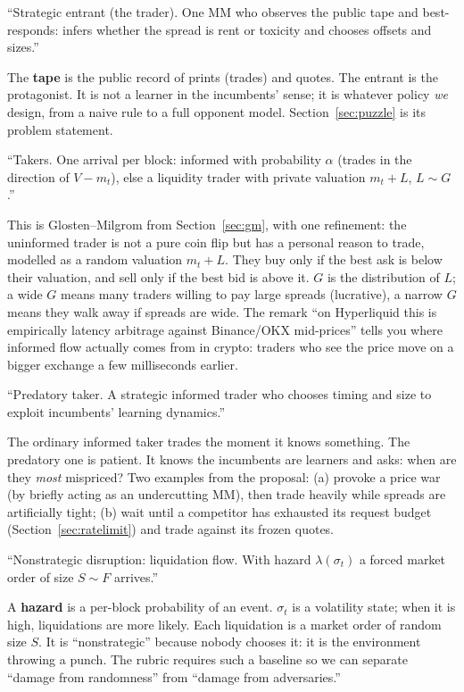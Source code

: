 \documentclass[11pt]{article}
\begin{document}
\begin{deliverable}
``Strategic entrant (the trader). One MM who observes the public tape and best-responds: infers whether the spread is rent or toxicity and chooses offsets and sizes.''
\end{deliverable}
The \textbf{tape} is the public record of prints (trades) and quotes. The entrant is the protagonist. It is not a learner in the incumbents' sense; it is whatever policy \emph{we} design, from a naive rule to a full opponent model. Section~\ref{sec:puzzle} is its problem statement.

\begin{deliverable}
``Takers. One arrival per block: informed with probability $\alpha$ (trades in the direction of $V-m_t$), else a liquidity trader with private valuation $m_t+L$, $L\sim G$.''
\end{deliverable}
This is Glosten--Milgrom from Section~\ref{sec:gm}, with one refinement: the uninformed trader is not a pure coin flip but has a personal reason to trade, modelled as a random valuation $m_t+L$. They buy only if the best ask is below their valuation, and sell only if the best bid is above it. $G$ is the distribution of $L$; a wide $G$ means many traders willing to pay large spreads (lucrative), a narrow $G$ means they walk away if spreads are wide. The remark ``on Hyperliquid this is empirically latency arbitrage against Binance/OKX mid-prices'' tells you where informed flow actually comes from in crypto: traders who see the price move on a bigger exchange a few milliseconds earlier.

\begin{deliverable}
``Predatory taker. A strategic informed trader who chooses timing and size to exploit incumbents' learning dynamics.''
\end{deliverable}
The ordinary informed taker trades the moment it knows something. The predatory one is patient. It knows the incumbents are learners and asks: when are they \emph{most} mispriced? Two examples from the proposal: (a) provoke a price war (by briefly acting as an undercutting MM), then trade heavily while spreads are artificially tight; (b) wait until a competitor has exhausted its request budget (Section~\ref{sec:ratelimit}) and trade against its frozen quotes.

\begin{deliverable}
``Nonstrategic disruption: liquidation flow. With hazard $\lambda(\sigma_t)$ a forced market order of size $S\sim F$ arrives.''
\end{deliverable}
A \textbf{hazard} is a per-block probability of an event. $\sigma_t$ is a volatility state; when it is high, liquidations are more likely. Each liquidation is a market order of random size $S$. It is ``nonstrategic'' because nobody chooses it: it is the environment throwing a punch. The rubric requires such a baseline so we can separate ``damage from randomness'' from ``damage from adversaries.''
\end{document}
